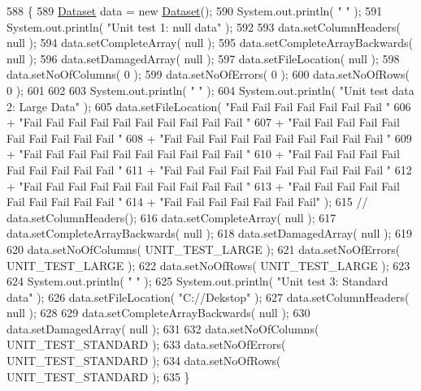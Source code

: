 \begin{DoxyCode}
588                                           \{
589         \hyperlink{class_dataset}{Dataset} data = \textcolor{keyword}{new} \hyperlink{class_dataset_a202d43d91e9362c7a65c677485d80509}{Dataset}();
590         System.out.println( \textcolor{stringliteral}{" "} );
591         System.out.println( \textcolor{stringliteral}{"Unit test 1: null data"} );
592         
593         data.setColumnHeaders( null );
594         data.setCompleteArray( null );
595         data.setCompleteArrayBackwards( null );
596         data.setDamagedArray( null );
597         data.setFileLocation( null );
598         data.setNoOfColumns( 0 );
599         data.setNoOfErrors( 0 );
600         data.setNoOfRows( 0 );
601         
602         
603         System.out.println( \textcolor{stringliteral}{" "} );
604         System.out.println( \textcolor{stringliteral}{"Unit test data 2: Large Data"} );
605         data.setFileLocation( \textcolor{stringliteral}{"Fail Fail Fail Fail Fail Fail Fail "}
606                              + \textcolor{stringliteral}{"Fail Fail Fail Fail Fail Fail Fail Fail Fail Fail "}
607                              + \textcolor{stringliteral}{"Fail Fail Fail Fail Fail Fail Fail Fail Fail Fail "}
608                              + \textcolor{stringliteral}{"Fail Fail Fail Fail Fail Fail Fail Fail Fail Fail "}
609                              + \textcolor{stringliteral}{"Fail Fail Fail Fail Fail Fail Fail Fail Fail Fail "}
610                              + \textcolor{stringliteral}{"Fail Fail Fail Fail Fail Fail Fail Fail Fail Fail "}
611                              + \textcolor{stringliteral}{"Fail Fail Fail Fail Fail Fail Fail Fail Fail Fail "}
612                              + \textcolor{stringliteral}{"Fail Fail Fail Fail Fail Fail Fail Fail Fail Fail "}
613                              + \textcolor{stringliteral}{"Fail Fail Fail Fail Fail Fail Fail Fail Fail Fail "}
614                              + \textcolor{stringliteral}{"Fail Fail Fail Fail Fail Fail Fail"} );
615         \textcolor{comment}{// data.setColumnHeaders();}
616         data.setCompleteArray( null );
617         data.setCompleteArrayBackwards( null );
618         data.setDamagedArray( null );
619         
620         data.setNoOfColumns( UNIT\_TEST\_LARGE );
621         data.setNoOfErrors( UNIT\_TEST\_LARGE );
622         data.setNoOfRows( UNIT\_TEST\_LARGE );
623         
624         System.out.println( \textcolor{stringliteral}{" "} );
625         System.out.println( \textcolor{stringliteral}{"Unit test 3: Standard data"} );
626         data.setFileLocation( \textcolor{stringliteral}{"C://Dekstop"} );
627         data.setColumnHeaders( null );
628         
629         data.setCompleteArrayBackwards( null );
630         data.setDamagedArray( null );
631         
632         data.setNoOfColumns( UNIT\_TEST\_STANDARD );
633         data.setNoOfErrors( UNIT\_TEST\_STANDARD );
634         data.setNoOfRows( UNIT\_TEST\_STANDARD );
635     \}
\end{DoxyCode}
